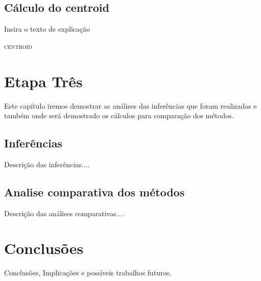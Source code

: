 \documentclass[courier]{uninove-ppgi}
\begin{document}
		\section{Cálculo do centroid}
		
			 Insira o texto de explicação
			 
            \begin{algorithm}[H]
             \SetAlgoLined
             \label{alg1}
             \caption{\textsc{centroid}}
             \end{algorithm}
			 
	\chapter{Etapa Três}
    
        \begin{resumocapitulo}
            Este capítulo iremos demostrar as análises das inferências que foram realizadas e também onde será demostrado os cálculos para comparação dos métodos. 
        \end{resumocapitulo}
		
		\section{Inferências}
		 
		 Descrição das inferências....
		
		\section{Analise comparativa dos métodos}
		
		 Descrição das análises comparativas....
		
	\chapter{Conclusões}
    
        \begin{resumocapitulo}
            Conclusões, Implicações e possíveis trabalhos futuros.
        \end{resumocapitulo}
		
\end{document}
